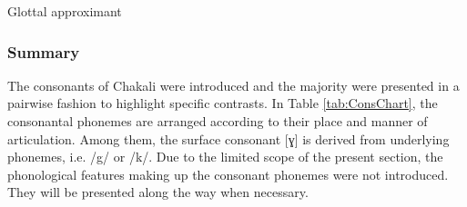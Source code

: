 \begin{table}[!htb] \small
\centering
\caption{Glottal  approximant\label{tab:glot-approx}}

\quad
{}
\end{table}





\subsubsection{Summary} 
\label{sec:sum-consonant}

The consonants of Chakali were introduced and the majority were
presented in a pairwise fashion to highlight specific contrasts. In Table
\ref{tab:ConsChart},  the  consonantal phonemes are arranged according to their
place and manner of articulation. Among them,  the surface consonant [ɣ] is 
derived from underlying phonemes, i.e. {\sls /g/} or  {\sls  /k/}.   Due to the
limited scope of the present section,  the phonological
features making up the consonant phonemes were not introduced. They will be
presented along the way
when necessary. 



